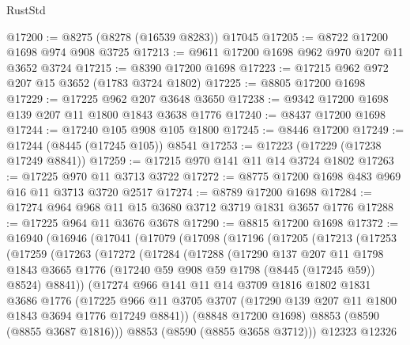 \begin{lexlean}{RustStd}
\begin{coremodule}
@17200 := @8275 (@8278 (@16539 @8283)) @17045
@17205 := @8722 @17200 @1698 @974 @908 @3725
@17213 := @9611 @17200 @1698 @962 @970 @207 @11 @3652 @3724
@17215 := @8390 @17200 @1698
@17223 := @17215 @962 @972 @207 @15 @3652 (@1783 @3724 @1802)
@17225 := @8805 @17200 @1698
@17229 := @17225 @962 @207 @3648 @3650
@17238 := @9342 @17200 @1698 @139 @207 @11 @1800 @1843 @3638 @1776
@17240 := @8437 @17200 @1698
@17244 := @17240 @105 @908 @105 @1800
@17245 := @8446 @17200
@17249 := @17244 (@8445 (@17245 @105)) @8541
@17253 := @17223 (@17229 (@17238 @17249 @8841))
@17259 := @17215 @970 @141 @11 @14 @3724 @1802
@17263 := @17225 @970 @11 @3713 @3722
@17272 := @8775 @17200 @1698 @483 @969 @16 @11 @3713 @3720 @2517
@17274 := @8789 @17200 @1698
@17284 := @17274 @964 @968 @11 @15 @3680 @3712 @3719 @1831 @3657 @1776
@17288 := @17225 @964 @11 @3676 @3678
@17290 := @8815 @17200 @1698
@17372 := @16940
    (@16946
      (@17041
        (@17079
          (@17098
            (@17196
              (@17205
                (@17213
                  (@17253
                    (@17259
                      (@17263
                        (@17272
                          (@17284
                            (@17288
                              (@17290
                                @137
                                @207
                                @11
                                @1798
                                @1843
                                @3665
                                @1776
                                (@17240 @59 @908 @59 @1798 (@8445 (@17245 @59)) @8524)
                                @8841))
                            (@17274
                              @966
                              @141
                              @11
                              @14
                              @3709
                              @1816
                              @1802
                              @1831
                              @3686
                              @1776
                              (@17225
                                @966
                                @11
                                @3705
                                @3707
                                (@17290 @139 @207 @11 @1800 @1843 @3694 @1776 @17249 @8841))
                              (@8848 @17200 @1698)
                              @8853
                              (@8590 (@8855 @3687 @1816)))
                            @8853
                            (@8590 (@8855 @3658 @3712)))
                          @12323
                          @12326

\end{coremodule}
\end{lexlean}
